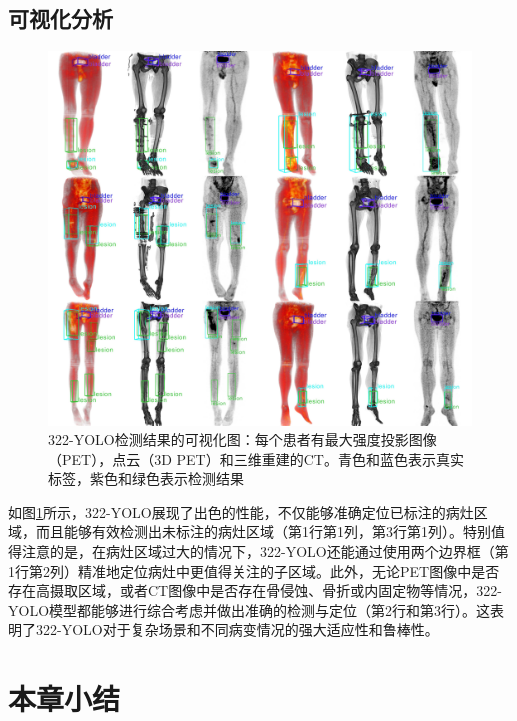 \subsection{可视化分析}
\begin{figure}
  \centering
  \includegraphics[width=\textwidth,height=\textheight,keepaspectratio]{figures/chap04_vis.jpg}
  \caption{322-YOLO检测结果的可视化图：每个患者有最大强度投影图像（PET），点云（3D PET）和三维重建的CT。青色和蓝色表示真实标签，紫色和绿色表示检测结果}
  \label{fig:chap04_vis}
\end{figure}

如图\ref{fig:chap04_vis}所示，322-YOLO展现了出色的性能，不仅能够准确定位已标注的病灶区域，而且能够有效检测出未标注的病灶区域（第1行第1列，第3行第1列）。特别值得注意的是，在病灶区域过大的情况下，322-YOLO还能通过使用两个边界框（第1行第2列）精准地定位病灶中更值得关注的子区域。此外，无论PET图像中是否存在高摄取区域，或者CT图像中是否存在骨侵蚀、骨折或内固定物等情况，322-YOLO模型都能够进行综合考虑并做出准确的检测与定位（第2行和第3行）。这表明了322-YOLO对于复杂场景和不同病变情况的强大适应性和鲁棒性。

\section{本章小结}

